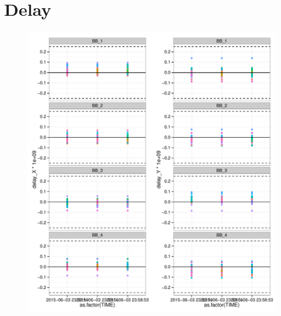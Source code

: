 \documentclass[10pt,]{article}
\begin{document}
\pagebreak

\section{Delay}\label{delay}

\begin{figure}[htbp]
\centering
\includegraphics{QA0rep_files/figure-latex/unnamed-chunk-13-1.pdf}
\caption{}
\end{figure}
\end{document}
